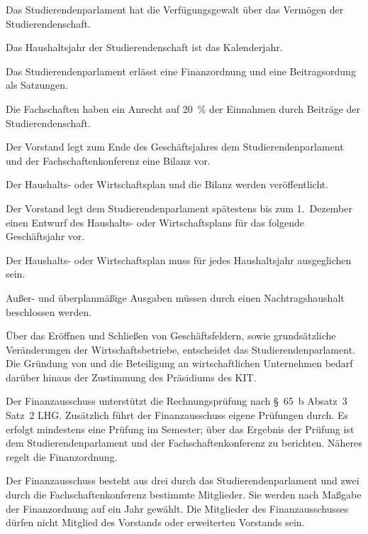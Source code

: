 
Das Studierendenparlament hat die Verfügungsgewalt über das Vermögen der Studierendenschaft.

Das Haushaltsjahr der Studierendenschaft ist das Kalenderjahr.

Das Studierendenparlament erlässt eine Finanzordnung und eine Beitragsordung als Satzungen.

Die Fachschaften haben ein Anrecht auf 20~\% der Einnahmen durch Beiträge der Studierendenschaft. \label{haushalt:fachschaftsgelder}

Der Vorstand legt zum Ende des Geschäftsjahres dem Studierendenparlament und der Fachschaftenkonferenz eine Bilanz vor.

Der Haushalts- oder Wirtschaftsplan und die Bilanz werden veröffentlicht.


 \label{haushalt:haushaltsplan}

Der Vorstand legt dem Studierendenparlament spätestens bis zum 1.~Dezember einen Entwurf des Haushalts- oder Wirtschaftsplans für das folgende Geschäftsjahr vor.

Der Haushalts- oder Wirtschaftsplan muss für jedes Haushaltsjahr ausgeglichen sein.

Außer- und überplanmäßige Ausgaben müssen durch einen Nachtragshaushalt beschlossen werden.

Über das Eröffnen und Schließen von Geschäftsfeldern, sowie grundsätzliche Veränderungen der Wirtschaftsbetriebe, entscheidet das Studierendenparlament. Die Gründung von und die Beteiligung an wirtschaftlichen Unternehmen bedarf darüber hinaus der Zustimmung des Präsidiums des KIT.


 \label{haushalt:finanzauschuss}

Der Finanzausschuss unterstützt die Rechnungsprüfung nach §~65~b Absatz~3 Satz~2 LHG. Zusätzlich führt der Finanzausschuss eigene Prüfungen durch. Es erfolgt mindestens eine Prüfung im Semester; über das Ergebnis der Prüfung ist dem Studierendenparlament und der Fachschaftenkonferenz zu berichten. Näheres regelt die Finanzordnung.

Der  Finanzausschuss besteht aus drei durch das Studierendenparlament und  zwei durch die Fachschaftenkonferenz bestimmte Mitglieder. Sie werden nach Maßgabe der Finanzordnung auf ein Jahr gewählt. Die Mitglieder des Finanzausschusses dürfen nicht Mitglied des Vorstands oder erweiterten Vorstands sein. \label{haushalt:finanzausschuss:wahl}


